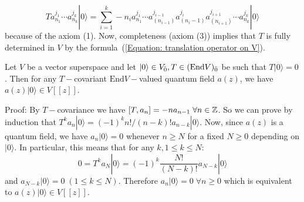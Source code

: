 \begin{equation}\label{Equation: translation operator on V}
    Ta_{n_1}^{j_1}\cdots a_{n_k}^{j_k}|0\rangle=\sum_{i=1}^k-n_ia_{n_1}^{j_1}\cdots a_{(n_{i-1})}^{j_{i-1}}a_{(n_i-1)}^{j_i}a_{(n_{i+1})}^{j_{i+1}}\cdots  a_{n_k}^{j_k}|0\rangle
\end{equation}
because of the axiom (1). Now, completeness (axiom (3)) implies that $T$ is fully determined in $V$ by the formula~(\ref{Equation: translation operator on V}).
\begin{dang}
    \begin{lemma}\label{Lemma: a(z)|0> only have positive powers of z}\cite{de2006finite}
        Let $V$ be a vector superspace and let $|0\rangle \in V_{\Bar{0}}, T\in(\text{End}V)_{\Bar{0}}$ be such that $T|0\rangle =0$. Then for any $T-$covariant $\text{End}V-$valued quantum field $a(z)$, we have $a(z)|0\rangle\in V[[z]]$.
    \end{lemma}
\end{dang}
Proof: By $T-$covariance we have $[T,a_n]=-na_{n-1}\;\forall n\in\mathbb{Z}$. So we can prove by induction that $T^ka_n|0\rangle = (-1)^kn!/(n-k)!a_{n-k}|0\rangle$. Now, since $a(z)$ is a quantum field, we have $a_n|0\rangle=0$ whenever $n\geq N$ for a fixed $N\geq0$ depending on $|0\rangle$. In particular, this means that for any $k, 1\leq k\leq N$:
\begin{equation}
    0=T^ka_N|0\rangle = (-1)^k\frac{N!}{(N-k)!}a_{N-k}|0\rangle
\end{equation}
and $a_{N-k}|0\rangle=0\;(1\leq k\leq N)$. Therefore $a_n|0\rangle=0\;\forall n\geq0$ which is equivalent to $a(z)|0\rangle\in V[[z]]$.

